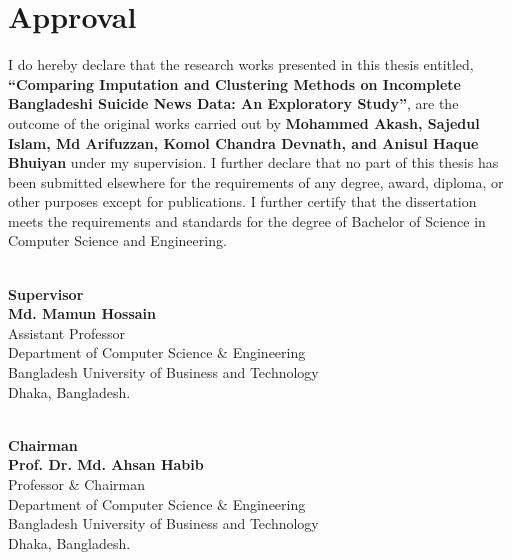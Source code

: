 \chapter*{Approval}

\noindent I do hereby declare that the research works presented in this thesis entitled,
\textbf{``Comparing Imputation and Clustering Methods on Incomplete
Bangladeshi Suicide News Data: An Exploratory Study''}, are the outcome of the original
works carried out by \textbf{Mohammed Akash, Sajedul Islam, Md Arifuzzan,
Komol Chandra Devnath, and Anisul Haque Bhuiyan} under my supervision. I further
declare that no part of this thesis has been submitted elsewhere for the requirements of any
degree, award, diploma, or other purposes except for publications. I further certify that the
dissertation meets the requirements and standards for the degree of Bachelor of Science
in Computer Science and Engineering.

\vspace{0.8in}

\noindent\hrulefill\hspace{2em}\\[2pt]
\textbf{Supervisor}\\
\textbf{Md. Mamun Hossain}\\
Assistant Professor\\
Department of Computer Science \& Engineering\\
Bangladesh University of Business and Technology\\
Dhaka, Bangladesh.

\vspace{0.6in}

\noindent\hrulefill\hspace{2em}\\[2pt]
\textbf{Chairman}\\
\textbf{Prof. Dr. Md. Ahsan Habib}\\
Professor \& Chairman\\
Department of Computer Science \& Engineering\\
Bangladesh University of Business and Technology\\
Dhaka, Bangladesh.

\clearpage
